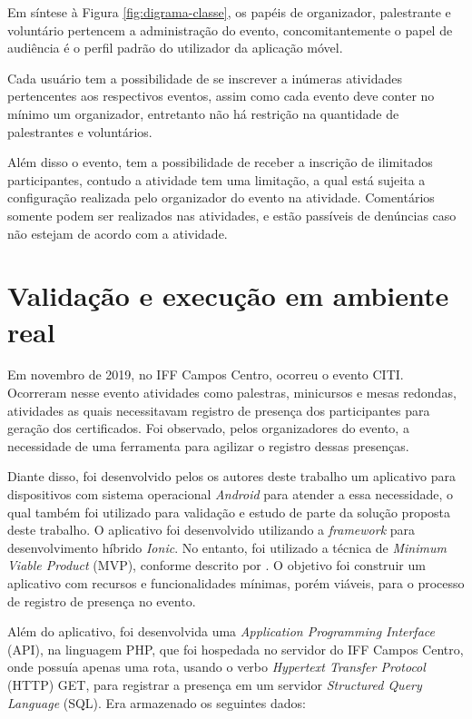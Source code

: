 Em síntese à Figura \ref{fig:digrama-classe}, os papéis de organizador, palestrante e voluntário pertencem a administração do evento, concomitantemente o papel de audiência é o perfil padrão do utilizador da aplicação móvel.

Cada usuário tem a possibilidade de se inscrever a inúmeras atividades pertencentes aos respectivos eventos, assim como cada evento deve conter no mínimo um organizador, entretanto não há restrição na quantidade de palestrantes e voluntários.

Além disso o evento, tem a possibilidade de receber a inscrição de ilimitados participantes, contudo a atividade tem uma limitação, a qual está sujeita a configuração realizada pelo organizador do evento na atividade. Comentários somente podem ser realizados nas atividades, e estão passíveis de denúncias caso não estejam de acordo com a atividade.

\section{Validação e execução em ambiente real}

Em novembro de 2019, no IFF Campos Centro, ocorreu o evento CITI. Ocorreram nesse evento atividades como palestras, minicursos e mesas redondas, atividades as quais necessitavam registro de presença dos participantes para geração dos certificados. Foi observado, pelos organizadores do evento, a necessidade de uma ferramenta para agilizar o registro dessas presenças. 

Diante disso, foi desenvolvido pelos os autores deste trabalho um aplicativo para dispositivos com sistema operacional \textit{Android} para atender a essa necessidade, o qual também foi utilizado para validação e estudo de parte da solução proposta deste trabalho. O aplicativo foi desenvolvido utilizando a \textit{framework} para desenvolvimento híbrido \textit{Ionic}. No entanto, foi utilizado a técnica de \textit{Minimum Viable Product} (MVP), conforme descrito por . O objetivo foi construir um aplicativo com recursos e funcionalidades mínimas, porém viáveis, para o processo de registro de presença no evento.

Além do aplicativo, foi desenvolvida uma \textit{Application Programming Interface} (API), na linguagem PHP, que foi hospedada no servidor do IFF Campos Centro, onde possuía apenas uma rota, usando o verbo \textit{Hypertext Transfer Protocol} (HTTP) GET, para registrar a presença em um servidor \textit{Structured Query Language} (SQL). Era armazenado os seguintes dados:

